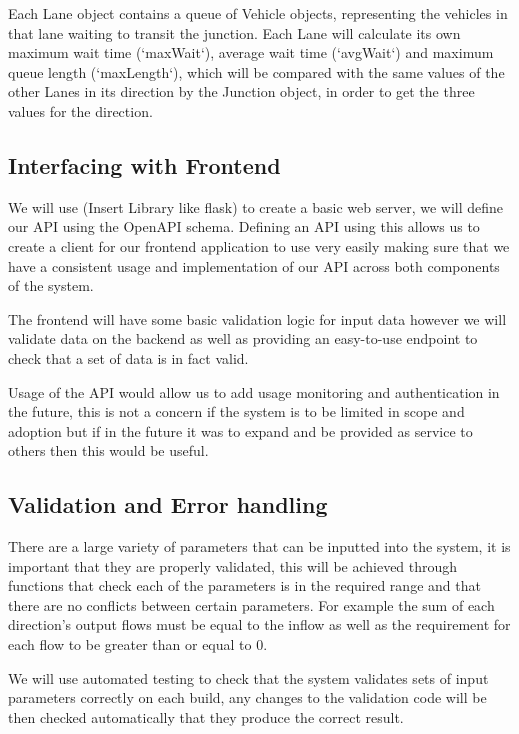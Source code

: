 \documentclass{article}
\begin{document}
Each Lane object contains a queue of Vehicle objects, representing the vehicles in that lane waiting to transit the junction. Each Lane 
will calculate its own maximum wait time (`maxWait`), average wait time (`avgWait`) and maximum queue length (`maxLength`), which will be 
compared with the same values of the other Lanes in its direction by the Junction object, in order to get the three values for the direction.

\subsection{Interfacing with Frontend}

We will use (Insert Library like flask) to create a basic web server, we will define 
our API using the OpenAPI schema. Defining an API using this allows us to create a 
client for our frontend application to use very easily making sure that we have a 
consistent usage and implementation of our API across both components of the system. 

The frontend will have some basic validation logic for input data however we will  
validate data on the backend as well as providing an easy-to-use endpoint to check that 
a set of data is in fact valid. 

Usage of the API would allow us to add usage monitoring and authentication in the future, 
this is not a concern if the system is to be limited in scope and adoption but if in the 
future it was to expand and be provided as service to others then this would be useful.

\subsection{Validation and Error handling}

There are a large variety of parameters that can be inputted into the system, it is 
important that they are properly validated, this will be achieved through functions 
that check each of the parameters is in the required range and that there are no 
conflicts between certain parameters. For example the sum of each direction's output 
flows must be equal to the inflow as well as the requirement for each flow to be 
greater than or equal to 0. 

We will use automated testing to check that the system validates sets of input 
parameters correctly on each build, any changes to the validation code will be then 
checked automatically that they produce the correct result. 
\end{document}

